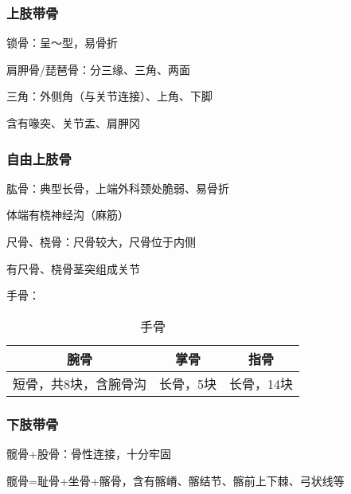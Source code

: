 \subsubsection*{上肢带骨}%
\label{subsub:上肢带骨}
\begin{notation}
    锁骨：呈～型，易骨折
\end{notation}
\begin{notation}
    肩胛骨/琵琶骨：分三缘、三角、两面

    三角：外侧角（与关节连接）、上角、下脚

    含有喙突、关节盂、肩胛冈
\end{notation}
\subsubsection*{自由上肢骨}%
\label{subsub:自由上肢骨}
\begin{notation}
    肱骨：典型长骨，上端外科颈处脆弱、易骨折

    体端有桡神经沟（麻筋）
\end{notation}
\begin{notation}
    尺骨、桡骨：尺骨较大，尺骨位于内侧

    有尺骨、桡骨茎突组成关节
\end{notation}
\begin{notation}
    手骨：
    \begin{table}[htpb]
        \centering
        \caption{手骨}
        \label{tab:手骨}
        \begin{tabular}{ccc}
        \toprule
        腕骨 & 掌骨 & 指骨\\
        \midrule
        短骨，共8块，含腕骨沟 & 长骨，5块 & 长骨，14块\\
        \bottomrule
        \end{tabular}
    \end{table}
\end{notation}
\subsubsection*{下肢带骨}%
\label{subsub:下肢带骨}
\begin{notation}
    髋骨+股骨：骨性连接，十分牢固

    髋骨=耻骨+坐骨+髂骨，含有髂嵴、髂结节、髂前上下棘、弓状线等
\end{notation}
